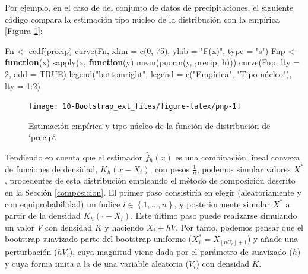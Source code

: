 \documentclass[
]{book}
\newenvironment{Shaded}{\begin{snugshade}}{\end{snugshade}}
\newcommand{\AttributeTok}[1]{\textcolor[rgb]{0.77,0.63,0.00}{#1}}
\newcommand{\ConstantTok}[1]{\textcolor[rgb]{0.00,0.00,0.00}{#1}}
\newcommand{\ControlFlowTok}[1]{\textcolor[rgb]{0.13,0.29,0.53}{\textbf{#1}}}
\newcommand{\DecValTok}[1]{\textcolor[rgb]{0.00,0.00,0.81}{#1}}
\newcommand{\FunctionTok}[1]{\textcolor[rgb]{0.00,0.00,0.00}{#1}}
\newcommand{\NormalTok}[1]{#1}
\newcommand{\OtherTok}[1]{\textcolor[rgb]{0.56,0.35,0.01}{#1}}
\newcommand{\SpecialCharTok}[1]{\textcolor[rgb]{0.00,0.00,0.00}{#1}}
\newcommand{\StringTok}[1]{\textcolor[rgb]{0.31,0.60,0.02}{#1}}
\theoremstyle{break}
\theoremstyle{nonumberplain}
\begin{document}
Por ejemplo, en el caso de del conjunto de datos de precipitaciones, el siguiente código compara la estimación tipo núcleo de la distribución con la empírica {[}Figura \ref{fig:pnp}{]}:

\begin{Shaded}
\begin{Highlighting}[]
\NormalTok{Fn }\OtherTok{\textless{}{-}} \FunctionTok{ecdf}\NormalTok{(precip)}
\FunctionTok{curve}\NormalTok{(Fn, }\AttributeTok{xlim =} \FunctionTok{c}\NormalTok{(}\DecValTok{0}\NormalTok{, }\DecValTok{75}\NormalTok{), }\AttributeTok{ylab =} \StringTok{"F(x)"}\NormalTok{, }\AttributeTok{type =} \StringTok{"s"}\NormalTok{)}
\NormalTok{Fnp }\OtherTok{\textless{}{-}} \ControlFlowTok{function}\NormalTok{(x) }\FunctionTok{sapply}\NormalTok{(x, }\ControlFlowTok{function}\NormalTok{(y) }\FunctionTok{mean}\NormalTok{(}\FunctionTok{pnorm}\NormalTok{(y, precip, h)))}
\FunctionTok{curve}\NormalTok{(Fnp, }\AttributeTok{lty =} \DecValTok{2}\NormalTok{, }\AttributeTok{add =} \ConstantTok{TRUE}\NormalTok{) }
\FunctionTok{legend}\NormalTok{(}\StringTok{"bottomright"}\NormalTok{, }\AttributeTok{legend =} \FunctionTok{c}\NormalTok{(}\StringTok{"Empírica"}\NormalTok{, }\StringTok{"Tipo núcleo"}\NormalTok{), }\AttributeTok{lty =} \DecValTok{1}\SpecialCharTok{:}\DecValTok{2}\NormalTok{)}
\end{Highlighting}
\end{Shaded}

\begin{figure}[!htb]

{\centering \texttt{[image: 10-Bootstrap\_ext\_files/figure-latex/pnp-1]} 

}

\caption{Estimación empírica y tipo núcleo de la función de distribución de `precip`. }\label{fig:pnp}
\end{figure}

Tendiendo en cuenta que el estimador \(\hat{f}_{h}\left( x \right)\) es una combinación lineal convexa de funciones de densidad, \(K_{h}\left(x-X_i \right)\), con pesos \(\frac{1}{n}\), podemos simular valores \(X^{\ast}\), procedentes de esta distribución empleando el método de composición descrito en la Sección \ref{composicion}.
El primer paso consistiría en elegir (aleatoriamente y con equiprobabilidad) un índice \(i\in \left\{ 1,\ldots ,n\right\}\), y posteriormente simular \(X^{\ast}\) a partir de la densidad \(K_{h}\left(\cdot -X_i \right)\).
Este último paso puede realizarse simulando un valor \(V\) con densidad \(K\) y haciendo \(X_i+hV\).
Por tanto, podemos pensar que el bootstrap suavizado parte del bootstrap uniforme (\(X_i^{\ast}=X_{\left\lfloor nU_i\right\rfloor +1}\)) y añade una perturbación (\(hV_i\)), cuya magnitud viene dada por el parámetro de suavizado (\(h\)) y cuya forma imita a la de una variable aleatoria (\(V_i\)) con densidad \(K\).
\end{document}
